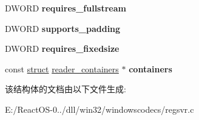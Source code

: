\begin{DoxyCompactItemize}
D\+W\+O\+RD {\bfseries requires\+\_\+fullstream}
\item 
\mbox{\label{structregsvr__metadatareader_a820759ba7c2b30a2cae494aa6639464d}} 
D\+W\+O\+RD {\bfseries supports\+\_\+padding}
\item 
\mbox{\label{structregsvr__metadatareader_aad6235d89351043809b0e1116c0620d1}} 
D\+W\+O\+RD {\bfseries requires\+\_\+fixedsize}
\item 
\mbox{\label{structregsvr__metadatareader_a269c90835fc12746ca12282206994307}} 
const \hyperlink{interfacestruct}{struct} \hyperlink{structreader__containers}{reader\+\_\+containers} $\ast$ {\bfseries containers}
\end{DoxyCompactItemize}


该结构体的文档由以下文件生成\+:\begin{DoxyCompactItemize}
\item 
E\+:/\+React\+O\+S-\/0../dll/win32/windowscodecs/regsvr.\+c\end{DoxyCompactItemize}
